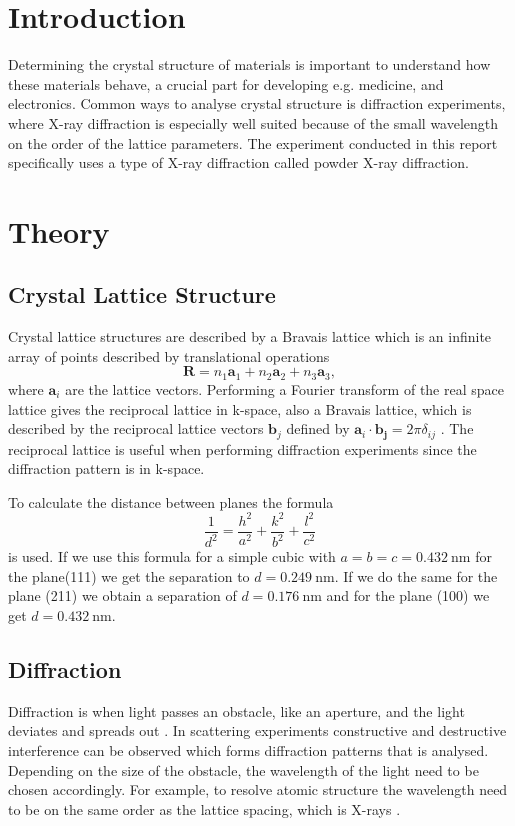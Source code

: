 \section{Introduction}
Determining the crystal structure of materials is important to understand how these materials behave, a crucial part for developing e.g. medicine, and electronics. Common ways to analyse crystal structure is diffraction experiments, where X-ray diffraction is especially well suited because of the small wavelength on the order of the lattice parameters. The experiment conducted in this report specifically uses a type of X-ray diffraction called powder X-ray diffraction.

\section{Theory}
\subsection{Crystal Lattice Structure}
Crystal lattice structures are described by a Bravais lattice \cite{hofmann2015} which is an infinite array of points described by translational operations
\begin{equation}
    \mathbf{R} = n_1\mathbf{a}_1 + n_2\mathbf{a}_2 + n_3\mathbf{a}_3,
\end{equation}
where $\mathbf{a}_i$ are the lattice vectors. Performing a Fourier transform of the real space lattice gives the reciprocal lattice in k-space, also a Bravais lattice, which is described by the reciprocal lattice vectors $\mathbf{b}_j$ defined by $\mathbf{a}_i \cdot \mathbf{b_j} = 2\pi \delta_{ij}$ \cite{hofmann2015}. The reciprocal lattice is useful when performing diffraction experiments since the diffraction pattern is in k-space. 

To calculate the distance between planes the formula 
\begin{equation}
\frac{1}{d^2}=\frac{h^2}{a^2}+\frac{k^2}{b^2}+\frac{l^2}{c^2}
\label{eq:seperation}
\end{equation}
is used.
If we use this formula for a simple cubic with $a=b=c=\SI{0.432}{\nano\m}$ for the plane(111) we get the separation to $d=\SI{0.249}{\nano\m}$. If we do the same for the plane (211) we obtain a separation of $d=\SI{0.176}{\nano\m}$ and for the plane (100) we get $d=\SI{0.432}{\nano\m}$. 



\subsection{Diffraction}
Diffraction is when light passes an obstacle, like an aperture, and the light deviates and spreads out \cite{hofmann2015}. In scattering experiments constructive and destructive interference can be observed which forms diffraction patterns that is analysed. Depending on the size of the obstacle, the wavelength of the light need to be chosen accordingly. For example, to resolve atomic structure the wavelength need to be on the same order as the lattice spacing, which is X-rays \cite{hofmann2015}.

